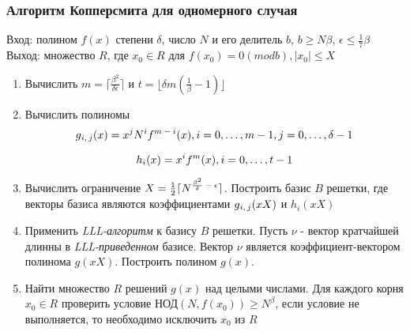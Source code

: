   \subsubsection{Алгоритм Копперсмита для одномерного случая}
    Вход: полином {$f(x)$} степени {$\delta$}, число {$N$} и его делитель {$b$}, {$b \ge N\beta$}, {$\epsilon \le \frac{1}{7} \beta$} \\
    Выход: множество {$R$}, где {$x_0 \in R$} для {$f(x_0) = 0 (mod b), |x_0| \le X$}
    
    \begin{enumerate}
      \item Вычислить {$m = \lceil \frac{\beta^2}{\delta \epsilon} \rceil$} и {$t = \lfloor \delta m (\frac{1}{\beta} - 1) \rfloor$}
      \item Вычислить полиномы
	\begin{equation}
	  \textit{{$ g\textsubscript{{$i,j$}}(x) = x^j N^i f\textsuperscript{{$m-i$}}(x), i=0, \dots, m-1, j=0, \dots, \delta-1 $}}
	\end{equation}
	
	\begin{equation}
	  \textit{{$ h_i(x) = x^i f^m(x), i = 0, \dots, t-1 $}}
	\end{equation}
	
      \item Вычислить ограничение {$X = \frac{1}{2} \lceil N\textsuperscript{{$\frac{\beta^2}{\delta} - \epsilon$}} \rceil$}. Построить базис {$B$} решетки,
	где векторы базиса являются коэффициентами {$g\textsubscript{{$i,j$}}(x X)$} и {$h_i(x X)$}
      \item Применить \textit{LLL-алгоритм} к базису {$B$} решетки. Пусть {$\nu$} - вектор кратчайшей длинны в \textit{LLL-приведенном} базисе. Вектор {$\nu$}
	является коэффициент-вектором полинома {$g(xX)$}. Построить полином {$g(x)$}.
      \item Найти множество {$R$} решений {$g(x)$} над целыми числами. Для каждого корня {$x_0 \in R$} проверить условие НОД{$(N, f(x_0)) \ge N^\beta$}, 
	если условие не выполняется, то необходимо исключить {$x_0$} из {$R$}
    \end{enumerate}    